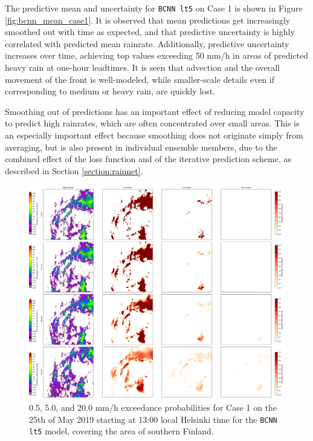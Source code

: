 The predictive mean and uncertainty for \texttt{BCNN lt5} on Case 1 is shown in Figure \ref{fig:bcnn_mean_case1}. It is observed that mean predictions get increasingly smoothed out with time as expected, and that predictive uncertainty is highly correlated with predicted mean rainrate. 
%
%
Additionally, predictive uncertainty increases over time, achieving top values exceeding 50 mm/h in areas of predicted heavy rain at one-hour leadtimes. It is seen that advection and the overall movement of the front is well-modeled, while smaller-scale details even if corresponding to medium or heavy rain, are quickly lost. 



Smoothing out of predictions has an important effect of reducing model capacity to predict high rainrates, which are often concentrated over small areas. This is an especially important effect because smoothing does not originate simply from averaging, but is also present in individual ensemble members, due to the combined effect of the loss function and of the iterative prediction scheme, as described in Section \ref{section:rainnet}. 

\begin{figure}[H]
	\centering
	\includegraphics[width=\textwidth]{images/cases/bcnn_prob_case1}
	\caption{0.5, 5.0, and 20.0 mm/h exceedance probabilities for Case 1 on the 25th of May 2019 starting at 13:00 local Helsinki time for the \texttt{BCNN lt5} model, covering the area of southern Finland.}
	\label{fig:bcnn_prob_case1}
\end{figure}

